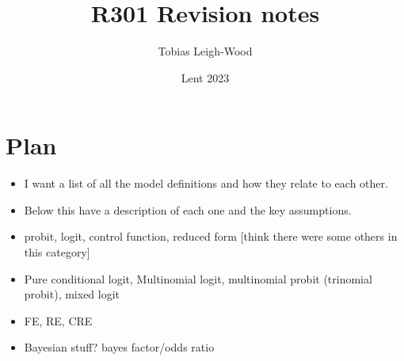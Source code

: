 \documentclass[12pt]{article}
\date{Lent 2023}
\title{R301 Revision notes}
\author{Tobias Leigh-Wood}
\begin{document}
\maketitle

\section*{Plan}
\begin{itemize}
    \item I want a list of all the model definitions and how they relate to each other.
    \item Below this have a description of each one and the key assumptions.

\end{itemize}

\begin{itemize}
    \item probit, logit, control function, reduced form [think there were some others in this category]
    \item Pure conditional logit, Multinomial logit, multinomial probit (trinomial probit), mixed logit
    \item FE, RE, CRE
    \item Bayesian stuff? bayes factor/odds ratio
\end{itemize}
\end{document}
